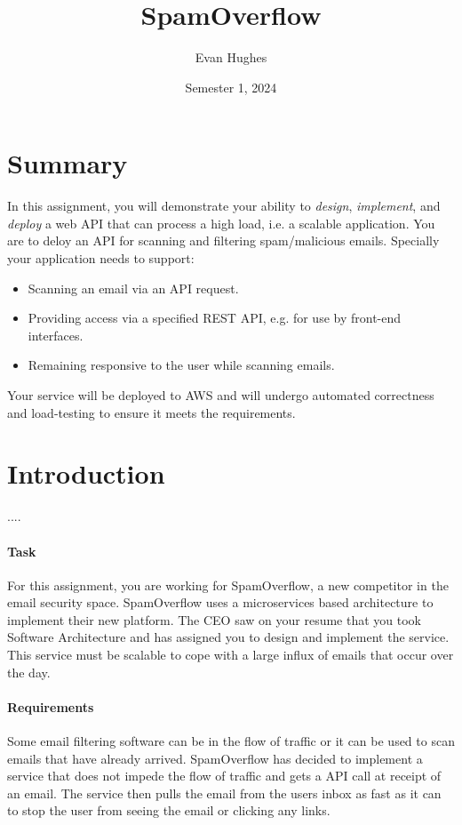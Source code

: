\documentclass{csse4400}
\title{SpamOverflow}
\author{Evan Hughes}
\date{Semester 1, 2024}
\begin{document}
\maketitle

\section*{Summary}
In this assignment, you will demonstrate your ability to \textsl{design},
\textsl{implement}, and \textsl{deploy} a web API that can process a high load,
i.e. a scalable application.
You are to deloy an API for scanning and filtering spam/malicious emails.
Specially your application needs to support:
\begin{itemize}
    \item Scanning an email via an API request.
    \item Providing access via a specified REST API, e.g. for use by front-end interfaces.
    \item Remaining responsive to the user while scanning emails.
\end{itemize}

Your service will be deployed to AWS and will undergo automated correctness and load-testing to ensure it meets the requirements.

\section{Introduction}
....

\paragraph{Task}
For this assignment, you are working for SpamOverflow, a new competitor in the email security space. SpamOverflow uses a microservices based architecture to implement their new platform. The CEO saw on your resume that you took Software Architecture and has assigned you to design and implement the service. This service must be scalable to cope with a large influx of emails that occur over the day.

\paragraph{Requirements}
Some email filtering software can be in the flow of traffic or it can be used to scan emails that have already arrived. SpamOverflow has decided to implement a service that does not impede the flow of traffic and gets a API call at receipt of an email. The service then pulls the email from the users inbox as fast as it can to stop the user from seeing the email or clicking any links.
\end{document}
